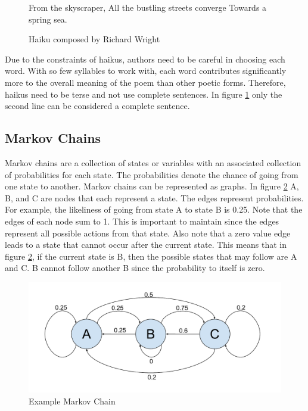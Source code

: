 \documentclass[]{article}
\begin{document}
\begin{figure}[H]
	\centering
	From the skyscraper, \break
	All the bustling streets converge \break
	Towards a spring sea.
	\caption{Haiku composed by Richard Wright \cite{Terebess}}
	\label{fig:WrightHaiku}
\end{figure}

Due to the constraints of haikus, authors need to be careful in choosing each word. With so few syllables to work with, each word contributes significantly more to the overall meaning of the poem than other poetic forms. Therefore, haikus need to be terse and not use complete sentences. In figure \ref{fig:WrightHaiku} only the second line can be considered a complete sentence.

\subsection{Markov Chains}

Markov chains are a collection of states or variables with an associated collection of probabilities for each state. The probabilities denote the chance of going from one state to another\cite{Markov}. Markov chains can be represented as graphs. In figure \ref{fig:Chain} A, B, and C are nodes that each represent a state. The edges represent probabilities. For example, the likeliness of going from state A to state B is 0.25. Note that the edges of each node sum to 1. This is important to maintain since the edges represent all possible actions from that state. Also note that a zero value edge leads to a state that cannot occur after the current state. This means that in figure \ref{fig:Chain}, if the current state is B, then the possible states that may follow are A and C. B cannot follow another B since the probability to itself is zero. 

\begin{figure}[H]
	\centering
	\includegraphics[width=1\textwidth]{MarkovChainExample}
	\caption{Example Markov Chain}
	\label{fig:Chain}
\end{figure}
\end{document}
